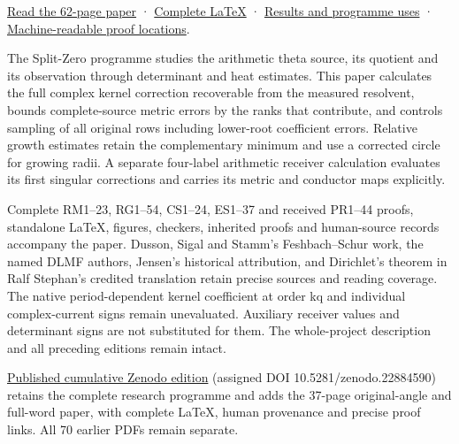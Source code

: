 \documentclass[
]{article}
\begin{document}
\href{https://github.com/KokunoYumeto/zeta-function-research-reader/blob/main/workbenches/splitzero-tandem/continuations/20260922-original-growth-resolvent/ORIGINAL_GROWTH_RESOLVENT_READER.pdf}{Read
the 62-page paper} ·
\href{https://github.com/KokunoYumeto/zeta-function-research-reader/blob/main/workbenches/splitzero-tandem/continuations/20260922-original-growth-resolvent/ORIGINAL_GROWTH_RESOLVENT_READER.tex}{Complete
LaTeX} ·
\href{https://github.com/KokunoYumeto/zeta-function-research-reader/blob/main/workbenches/splitzero-tandem/continuations/20260922-original-growth-resolvent/RESULTS_20260922_020.md}{Results
and programme uses} ·
\href{https://github.com/KokunoYumeto/zeta-function-research-reader/blob/main/workbenches/splitzero-tandem/continuations/20260922-original-growth-resolvent/RESULT_INDEX.json}{Machine-readable
proof locations}.

The Split-Zero programme studies the arithmetic theta source, its
quotient and its observation through determinant and heat estimates.
This paper calculates the full complex kernel correction recoverable
from the measured resolvent, bounds complete-source metric errors by the
ranks that contribute, and controls sampling of all original rows
including lower-root coefficient errors. Relative growth estimates
retain the complementary minimum and use a corrected circle for growing
radii. A separate four-label arithmetic receiver calculation evaluates
its first singular corrections and carries its metric and conductor maps
explicitly.

Complete RM1--23, RG1--54, CS1--24, ES1--37 and received PR1--44 proofs,
standalone LaTeX, figures, checkers, inherited proofs and human-source
records accompany the paper. Dusson, Sigal and Stamm's Feshbach--Schur
work, the named DLMF authors, Jensen's historical attribution, and
Dirichlet's theorem in Ralf Stephan's credited translation retain
precise sources and reading coverage. The native period-dependent kernel
coefficient at order kq and individual complex-current signs remain
unevaluated. Auxiliary receiver values and determinant signs are not
substituted for them. The whole-project description and all preceding
editions remain intact.

\href{https://zenodo.org/records/22884590}{Published cumulative Zenodo
edition} (assigned DOI 10.5281/zenodo.22884590) retains the complete
research programme and adds the 37-page original-angle and full-word
paper, with complete LaTeX, human provenance and precise proof links.
All 70 earlier PDFs remain separate.
\end{document}
